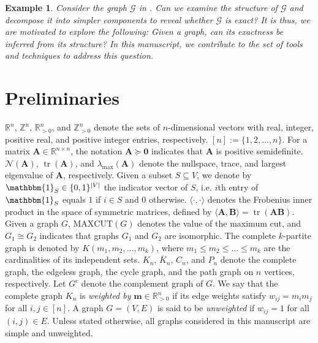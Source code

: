 \documentclass[a4paper,fleqn]{cas-sc}
\newcommand{\1}{\mathbf{1}}
\newcommand{\bm}{\mathbf{m}}
\newtheorem{example}{Example}
\begin{document}
\begin{example}\label{example1}
Consider the graph $\mathcal{G}$ in . Can we examine the structure of $\mathcal{G}$ and decompose it into simpler components to reveal whether $\mathcal{G}$ is exact? It is thus, we are motivated to explore the following: Given a graph, can its exactness be inferred from its structure? In this manuscript, we contribute to the set of tools and techniques to address this question.
\end{example} 

\section{Preliminaries}\label{sec3}

$\mathbb{R}^n$, $\mathbb{Z}^n$, $\mathbb{R}_{>0}^n$, and $\mathbb{Z}_{>0}^n$ denote the sets of $n$-dimensional vectors with real, integer, positive real, and positive integer entries, respectively. $[n] := \{1, 2, \ldots, n\}$. For a matrix $\mathbf{A} \in \mathbb{R}^{n \times n}$, the notation $\mathbf{A} \succeq \mathbf{0}$ indicates that $\mathbf{A}$ is positive semidefinite. $\mathcal{N}(\mathbf{A})$, $\operatorname{tr}(\mathbf{A})$, and $\lambda_{\max}(\mathbf{A})$ denote the nullspace, trace, and largest eigenvalue of $\mathbf{A}$, respectively. Given a subset $S \subseteq V$, we denote by $\mathbbm{1}_S \in \{0,1\}^{|V|}$ the indicator vector of $S$, i.e. $i$th entry of $\mathbbm{1}_S$ equals $1$ if $i \in S$ and $0$ otherwise. $\langle \cdot , \cdot \rangle$ denotes the Frobenius inner product in the space of symmetric matrices, defined by $\langle \mathbf{A}, \mathbf{B} \rangle = \operatorname{tr}(\mathbf{A} \mathbf{B})$. Given a graph $G$, $\mathrm{MAXCUT}(G)$ denotes the value of the maximum cut, and $G_1 \cong G_2$ indicates that graphs $G_1$ and $G_2$ are isomorphic. The complete $k$-partite graph is denoted by $K(m_1, m_2, \ldots, m_k)$, where $m_1 \le m_2\leq \ldots \leq m_k$ are the cardinalities of its independent sets. $K_n$, $\overline{K}_n$, $C_n$, and $P_n$ denote the complete graph, the edgeless graph, the cycle graph, and the path graph on $n$ vertices, respectively. Let $G^c$ denote the complement graph of $G$. We say that the complete graph $K_n$ is \emph{weighted by} $\bm \in \mathbb{R}_{>0}^n$ if its edge weights satisfy $w_{ij} = m_i m_j$ for all $i, j \in [n]$. A graph $G = (V, E)$ is said to be \emph{unweighted} if $w_{ij} = 1$ for all $(i,j) \in E$. Unless stated otherwise, all graphs considered in this manuscript are simple and unweighted.\\
\end{document}
